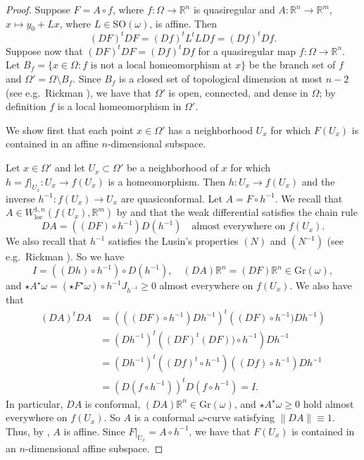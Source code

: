 \documentclass[a4paper,leqno,11pt]{amsart}
\numberwithin{equation}{section}
\theoremstyle{remark}
\theoremstyle{remark}
\newcommand{\R}{\mathbb{R}}
\DeclareMathOperator{\loc}{loc}
\newcommand{\Gr}{\mathrm{Gr}}
\newcommand{\SO}{\mathrm{SO}}
\begin{document}
\begin{proof}
Suppose $F = A \circ f$, where $f\colon \Omega \to \R^n$ is quasiregular and $A\colon \R^n \to \R^m$, $x\mapsto y_0 + Lx$, where $L\in \SO(\omega)$, is affine. Then 
\[
(DF)^t DF = (Df)^t L^t L Df = (Df)^t Df.
\]
Suppose now that $(DF)^t DF = (Df)^t Df$ for a quasiregular map $f \colon \Omega \to \R^n$. Let $B_f = \{ x\in \Omega \colon f \text{ is not a local homeomorphism at } x\}$ be the branch set of $f$ and $\Omega' = \Omega \setminus B_f$. Since $B_f$ is a closed set of topological dimension at most $n-2$ (see e.g.~Rickman \cite[Section I.4]{Ric:93}), we have that $\Omega'$ is open, connected, and dense in $\Omega$; by definition $f$ is a local homeomorphism in $\Omega'$.

We show first that each point $x\in \Omega'$ has a neighborhood $U_x$ for which $F( U_x )$ is contained in an affine $n$-dimensional subspace.

Let $x \in \Omega'$ and let $U_x \subset \Omega'$ be a neighborhood of $x$ for which $h = f|_{U_x} \colon U_x \to f(U_x)$ is a homeomorphism. Then $h \colon U_x \to f(U_x)$ and the inverse $h^{-1} \colon f(U_x) \to U_x$ are quasiconformal. Let $A = F \circ h^{-1}$. We recall that $A \in W^{1,n}_{\loc}( f(U_x), \R^m )$ by \cite[Lemma VI.6.6]{Ric:93} and that the weak differential satisfies the chain rule
\begin{equation*}
    DA = ( (DF) \circ h^{-1} ) D(h^{-1})
    \quad\text{almost everywhere on $f(U_x)$.}
\end{equation*}
We also recall that $h^{-1}$ satisfies the Lusin's properties $(N)$ and $(N^{-1})$ (see e.g.~Rickman \cite[Theorem II.7.4(3)]{Ric:93}). So we have
\begin{equation*}
    I = ( (Dh) \circ h^{-1} ) \circ D( h^{-1} ),
    \quad
    (DA)\R^n = (DF)\R^n \in \Gr( \omega ),
\end{equation*}
and $\star A^{\star}\omega = ( \star F^{\star}\omega ) \circ h^{-1} J_{h^{-1}}\geq 0$ almost everywhere on $f(U_x)$. We also have that 
\begin{align*}
(DA)^t DA 
&= \left( ((DF)\circ h^{-1}) Dh^{-1} \right)^t 
\left((DF)\circ h^{-1}) Dh^{-1}\right) \\
&= (Dh^{-1})^t \left( (DF)^t (DF))\circ h^{-1} \right) Dh^{-1} \\
&= (Dh^{-1})^t ( (Df)^t \circ h^{-1}) ((Df) \circ h^{-1}) Dh^{-1} \\ 
&= (D(f\circ h^{-1}))^t D(f\circ h^{-1}) 
= I.
\end{align*}
In particular, $DA$ is conformal, $(DA)\R^n \in \mathrm{Gr}( \omega )$, and $\star A^{\star}\omega \geq 0$ hold almost everywhere on $f(U_x)$. So $A$ is a conformal $\omega$-curve satisfying $\|DA\| \equiv 1$. Thus, by , $A$ is affine. Since $F|_{U_x} = A \circ h^{-1}$, we have that $F(U_x)$ is contained in an $n$-dimensional affine subspace.


\end{proof}
\end{document}
